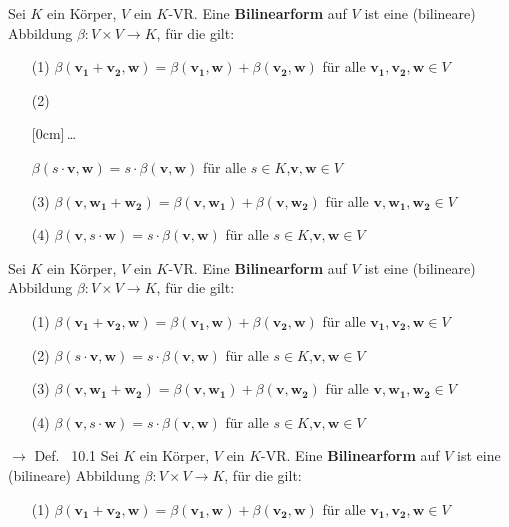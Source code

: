 \documentclass[11pt]{article}
\renewcommand{\cite}[1]{\par\bigskip\hfill{\color{gray}\tiny\(\to\) #1}}
\renewcommand{\vec}[1]{\mathbf{#1}}
\newcommand{\hide}[1]{\parbox{0cm}{\raisebox{-7pt}[0cm]{\dots}}\color{white}#1\color{black}}
\let\olddots\dots
\renewcommand{\dots}{\,\olddots\,}
\newenvironment{field}{}{\newpage}
\newif\ifnote
\newenvironment{note}{\notetrue}{\notefalse}
\begin{document}
\begin{note}
\begin{field}
    Sei \(K\) ein Körper, \(V\) ein \(K\)-VR. Eine \textbf{Bilinearform} auf \(V\) ist eine (bilineare) Abbildung  \(\beta\colon V\times V \to K\), für die gilt:
    \begin{itemize}
        \item[(1)] \(\beta(\vec{v_1} + \vec{v_2}, \vec{w}) = \beta(\vec{v_1}, \vec{w}) + \beta(\vec{v_2}, \vec{w})\) für alle \(\vec{v_1, v_2, w} \in V\)
        \item[(2)] \hide{\(\beta(s\cdot\vec{v},\vec{w}) = s\cdot\beta(\vec{v},\vec{w})\) für alle \(s\in K\),\(\vec{v},\vec{w}\in V\)}
        \item[(3)]\(\beta(\vec{v}, \vec{w_1} + \vec{w_2}) = \beta(\vec{v}, \vec{w_1}) + \beta(\vec{v}, \vec{w_2})\) für alle \(\vec{v, w_1, w_2} \in V\)
        \item[(4)]\(\beta(\vec{v},s\cdot\vec{w}) = s\cdot\beta(\vec{v},\vec{w})\) für alle \(s\in K\),\(\vec{v},\vec{w}\in V\)
    \end{itemize}
    \end{field}
    \begin{field} %
    Sei \(K\) ein Körper, \(V\) ein \(K\)-VR. Eine \textbf{Bilinearform} auf \(V\) ist eine (bilineare) Abbildung  \(\beta\colon V\times V \to K\), für die gilt:
    \begin{itemize}
        \item[(1)] \(\beta(\vec{v_1} + \vec{v_2}, \vec{w}) = \beta(\vec{v_1}, \vec{w}) + \beta(\vec{v_2}, \vec{w})\) für alle \(\vec{v_1, v_2, w} \in V\)
        \item[(2)] \(\beta(s\cdot\vec{v},\vec{w}) = s\cdot\beta(\vec{v},\vec{w})\) für alle \(s\in K\),\(\vec{v},\vec{w}\in V\)
        \item[(3)]\(\beta(\vec{v}, \vec{w_1} + \vec{w_2}) = \beta(\vec{v}, \vec{w_1}) + \beta(\vec{v}, \vec{w_2})\) für alle \(\vec{v, w_1, w_2} \in V\)
        \item[(4)]\(\beta(\vec{v},s\cdot\vec{w}) = s\cdot\beta(\vec{v},\vec{w})\) für alle \(s\in K\),\(\vec{v},\vec{w}\in V\)
    \end{itemize}
    \cite{Def. ~10.1}
    \end{field}
    \begin{field} %
    Sei \(K\) ein Körper, \(V\) ein \(K\)-VR. Eine \textbf{Bilinearform} auf \(V\) ist eine (bilineare) Abbildung  \(\beta\colon V\times V \to K\), für die gilt:
    \begin{itemize}
        \item[(1)] \(\beta(\vec{v_1} + \vec{v_2}, \vec{w}) = \beta(\vec{v_1}, \vec{w}) + \beta(\vec{v_2}, \vec{w})\) für alle \(\vec{v_1, v_2, w} \in V\)

\end{itemize}
\end{field}
\end{note}
\end{document}
